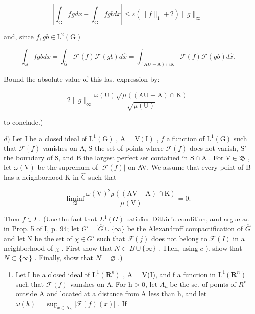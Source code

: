 \[
\left| \int_ {\mathrm{G}} f g d x - \int_ {\mathrm{G}} f g b d x \right| \leqslant \varepsilon (\| f \| _ {1} + 2) \| g \| _ {\infty}
\]

and, since \(f, gb \in \mathrm{L}^{2}(\mathrm{G})\) ,

\[
\int_ {\mathrm{G}} f g b d x = \int_ {\widehat {\mathrm{G}}} \mathcal {F} (f) \mathcal {F} (g b) d \widehat {x} = \int_ {(\mathrm{AU-A}) \cap \mathrm{K}} \mathcal {F} (f) \mathcal {F} (g b) d \widehat {x}.
\]

Bound the absolute value of this last expression by:

\[
2 \| g \| _ {\infty} \frac {\omega (\mathrm{U}) \sqrt {\mu ((\mathrm{AU} - \mathrm{A}) \cap \mathrm{K})}}{\sqrt {\mu (\mathrm{U})}}
\]

to conclude.)

\(d)\) Let I be a closed ideal of \(\mathrm{L}^1 (\mathrm{G})\) , \(\mathrm{A} = \mathrm{V}(\mathrm{I})\) , \(f\) a function of \(\mathrm{L}^1 (\mathrm{G})\) such that \(\mathcal{F}(f)\) vanishes on A, S the set of points where \(\mathcal{F}(f)\) does not vanish, \(\mathrm{S}'\) the boundary of S, and B the largest perfect set contained in \(\mathrm{S} \cap \mathrm{A}\) . For \(\mathrm{V} \in \mathfrak{B}\) , let \(\omega (\mathrm{V})\) be the supremum of \(|\mathcal{F}(f)|\) on AV. We assume that every point of B has a neighborhood K in \(\widehat{\mathrm{G}}\) such that

\[
\operatorname * {l i m i n f} _ {\mathfrak {B}} \frac {\omega (\mathrm{V}) ^ {2} \mu ((\mathrm{AV-A}) \cap \mathrm{K})}{\mu (\mathrm{V})} = 0.
\]

Then \(f \in I\) . (Use the fact that \(L^1(G)\) satisfies Ditkin's condition, and argue as in Prop. 5 of I, p.~94; let \(G' = \widehat{G} \cup \{\infty\}\) be the Alexandroff compactification of \(\widehat{G}\) and let N be the set of \(\chi \in G'\) such that \(\mathcal{F}(f)\) does not belong to \(\mathcal{F}(I)\) in a neighborhood of \(\chi\) . First show that \(N \subset B \cup \{\infty\}\) . Then, using \(c\) ), show that \(N \subset \{\infty\}\) . Finally, show that \(N = \varnothing\) .)

\begin{enumerate}
\def\labelenumi{\alph{enumi})}
\setcounter{enumi}{4}
\tightlist
\item
  Let I be a closed ideal of \(\mathrm{L}^{1}(\mathbf{R}^{n})\) , A = V(I), and f a function in \(\mathrm{L}^{1}(\mathbf{R}^{n})\) such that \(\mathcal{F}(f)\) vanishes on A. For h \textgreater{} 0, let \(A_{h}\) be the set of points of \(R^{n}\) outside A and located at a distance from A less than h, and let \(\omega(h) = \sup_{x \in \mathrm{A}_{h}} |\mathcal{F}(f)(x)|\) . If
\end{enumerate}

